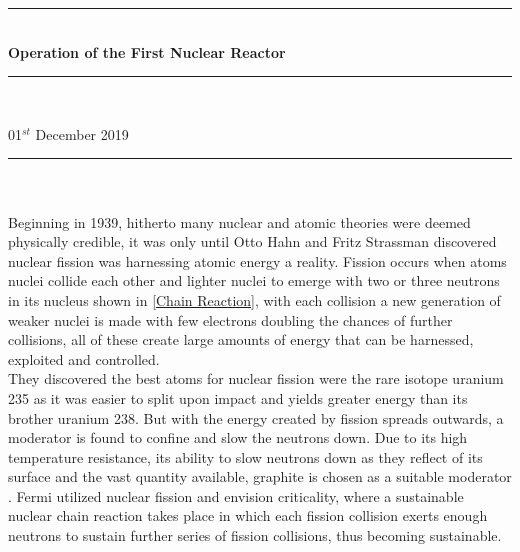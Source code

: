 \documentclass[11pt]{article}
\begin{document}
\begin{center}
    \rule{18cm}{0.03cm} \\ [0.35cm]
    \textbf{\Huge{Operation of the First Nuclear Reactor}} \\
    \rule{18cm}{0.04cm} \\
\end{center}

\begin{multicols}{2}

 \hspace{1.1cm} 01$^{st}$ December 2019 \\ [-0.2cm]
\rule{9cm}{0.03cm} \\ [-0.45cm]

 \\ [-0.47cm]

Beginning in 1939, hitherto many nuclear and atomic theories were deemed physically credible, it was only until Otto Hahn and Fritz Strassman discovered nuclear fission was harnessing atomic energy a reality. Fission occurs when atoms nuclei collide each other and lighter nuclei to emerge with two or three neutrons in its nucleus shown in \cref{Chain Reaction}, with each collision a new generation of weaker nuclei is made with few electrons doubling the chances of further collisions, all of these create large amounts of energy that can be harnessed, exploited and controlled\cite{NucPhys}. \\
\indent They discovered the best atoms for nuclear fission were the rare isotope uranium 235 as it was easier to split upon impact and yields greater energy than its brother uranium 238. But with the energy created by fission spreads outwards, a moderator is found to confine and slow the neutrons down. Due to its high temperature resistance, its ability to slow neutrons down as they reflect of its surface and the vast quantity available, graphite is chosen as a suitable moderator \cite{Fermi}. Fermi utilized nuclear fission and envision criticality, where a sustainable nuclear chain reaction takes place in which each fission collision exerts enough neutrons to sustain further series of fission collisions, thus becoming sustainable. \\ [-0.5cm]


\end{multicols}
\end{document}
